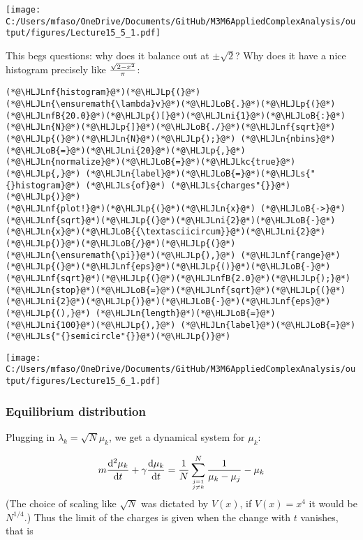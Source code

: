 \documentclass[12pt,a4paper]{article}
\newcommand{\HLJLkc}[1]{\textcolor[RGB]{59,151,46}{\textit{#1}}}
\newcommand{\HLJLn}[1]{#1}
\newcommand{\HLJLnf}[1]{\textcolor[RGB]{66,102,213}{#1}}
\newcommand{\HLJLs}[1]{\textcolor[RGB]{201,61,57}{#1}}
\newcommand{\HLJLnfB}[1]{\textcolor[RGB]{59,151,46}{#1}}
\newcommand{\HLJLni}[1]{\textcolor[RGB]{59,151,46}{#1}}
\newcommand{\HLJLoB}[1]{\textcolor[RGB]{102,102,102}{\textbf{#1}}}
\newcommand{\HLJLp}[1]{#1}
\def\D{ {\rm d} }
\begin{document}
\texttt{[image: C:/Users/mfaso/OneDrive/Documents/GitHub/M3M6AppliedComplexAnalysis/output/figures/Lecture15\_5\_1.pdf]}

This begs questions: why does it balance out at $\pm \sqrt 2$?  Why does it have a nice histogram precisely like ${\sqrt{2-x^2} \over \pi}$:


\begin{lstlisting}
(*@\HLJLnf{histogram}@*)(*@\HLJLp{(}@*)(*@\HLJLn{\ensuremath{\lambda}v}@*)(*@\HLJLoB{.}@*)(*@\HLJLp{(}@*)(*@\HLJLnfB{20.0}@*)(*@\HLJLp{)[}@*)(*@\HLJLni{1}@*)(*@\HLJLoB{:}@*)(*@\HLJLn{N}@*)(*@\HLJLp{]}@*)(*@\HLJLoB{./}@*)(*@\HLJLnf{sqrt}@*)(*@\HLJLp{(}@*)(*@\HLJLn{N}@*)(*@\HLJLp{);}@*) (*@\HLJLn{nbins}@*)(*@\HLJLoB{=}@*)(*@\HLJLni{20}@*)(*@\HLJLp{,}@*) (*@\HLJLn{normalize}@*)(*@\HLJLoB{=}@*)(*@\HLJLkc{true}@*)(*@\HLJLp{,}@*) (*@\HLJLn{label}@*)(*@\HLJLoB{=}@*)(*@\HLJLs{"{}histogram}@*) (*@\HLJLs{of}@*) (*@\HLJLs{charges"{}}@*)(*@\HLJLp{)}@*)
(*@\HLJLnf{plot!}@*)(*@\HLJLp{(}@*)(*@\HLJLn{x}@*) (*@\HLJLoB{->}@*) (*@\HLJLnf{sqrt}@*)(*@\HLJLp{(}@*)(*@\HLJLni{2}@*)(*@\HLJLoB{-}@*)(*@\HLJLn{x}@*)(*@\HLJLoB{{\textasciicircum}}@*)(*@\HLJLni{2}@*)(*@\HLJLp{)}@*)(*@\HLJLoB{/}@*)(*@\HLJLp{(}@*)(*@\HLJLn{\ensuremath{\pi}}@*)(*@\HLJLp{),}@*) (*@\HLJLnf{range}@*)(*@\HLJLp{(}@*)(*@\HLJLnf{eps}@*)(*@\HLJLp{()}@*)(*@\HLJLoB{-}@*)(*@\HLJLnf{sqrt}@*)(*@\HLJLp{(}@*)(*@\HLJLnfB{2.0}@*)(*@\HLJLp{);}@*) (*@\HLJLn{stop}@*)(*@\HLJLoB{=}@*)(*@\HLJLnf{sqrt}@*)(*@\HLJLp{(}@*)(*@\HLJLni{2}@*)(*@\HLJLp{)}@*)(*@\HLJLoB{-}@*)(*@\HLJLnf{eps}@*)(*@\HLJLp{(),}@*) (*@\HLJLn{length}@*)(*@\HLJLoB{=}@*)(*@\HLJLni{100}@*)(*@\HLJLp{),}@*) (*@\HLJLn{label}@*)(*@\HLJLoB{=}@*)(*@\HLJLs{"{}semicircle"{}}@*)(*@\HLJLp{)}@*)
\end{lstlisting}

\texttt{[image: C:/Users/mfaso/OneDrive/Documents/GitHub/M3M6AppliedComplexAnalysis/output/figures/Lecture15\_6\_1.pdf]}

\subsubsection{Equilibrium distribution}
Plugging in $\lambda_k = \sqrt N \mu_k$, we get a dynamical system for $\mu_k$:

\[
 m {\D^2  \mu_k \over \D t} + \gamma {\D  \mu_k \over \D t}= {1 \over N} \sum_{j=1 \atop j \neq k}^N {1 \over \mu_k -\mu_j} -  \mu_k
\]
(The choice of scaling like $\sqrt N$ was dictated by $V(x)$, if $V(x) = x^4$ it would be $N^{1/4}$.) Thus the limit of the charges is given when the change with $t$ vanishes, that is
\end{document}
